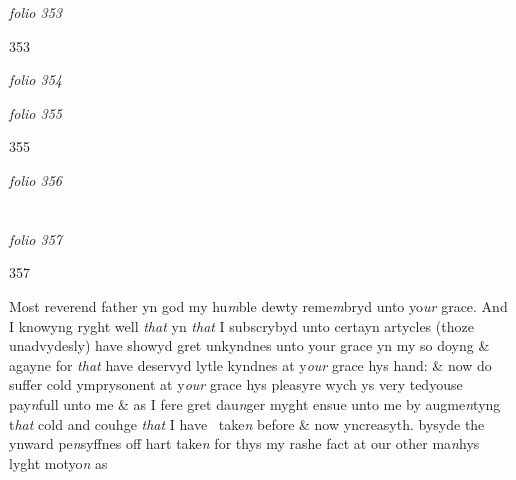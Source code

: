 \documentclass[12pt, a4paper]{book}
\begin{document}
\dotfill
						

\textit{folio 353}


\begin{flushright}{\color{Mahogany}353}\end{flushright}

\dotfill
						\newpage
{}

\textit{folio 354}


         \vspace*{4cm}
         
\dotfill
						

\textit{folio 355}


\begin{flushright}{\color{Mahogany}355}\end{flushright}

\dotfill
						\newpage
{}

\textit{folio 356}


         \vspace*{4cm}
         
\dotfill
						  \section*{}

\textit{folio 357}



\begin{flushright}{\color{Mahogany}357}\end{flushright}

		\ifthenelse{\isodd{\thepage}}
		{\reversemarginpar}
		{\normalmarginpar}
		Most reverend father yn god my hu\textit{m}ble dewty reme\textit{m}bryd unto yo\textit{ur} 
grace. And I knowyng ryght well \textit{that} yn \textit{that} I subscrybyd unto certayn
artycles (thoze unadvydesly) have showyd gret unkyndnes unto your
grace yn my so doyng \& agayne for \textit{that} have deservyd lytle kyndnes
at y\textit{our} grace hys hand: \& now do suffer cold ymprysonent at y\textit{our} grace
hys pleasyre wych ys very tedyouse pay\textit{n}full unto me \& as I fere gret
dau\textit{n}ger myght ensue unto me by augme\textit{n}tyng t\textit{hat} cold and couhge \textit{that} I have 
take\textit{n} before \& now yncreasyth. bysyde the ynward pe\textit{n}syffnes off hart
take\textit{n} for thys my rashe fact at our other ma\textit{n}hys lyght motyo\textit{n}
               as 
			
\end{document}
